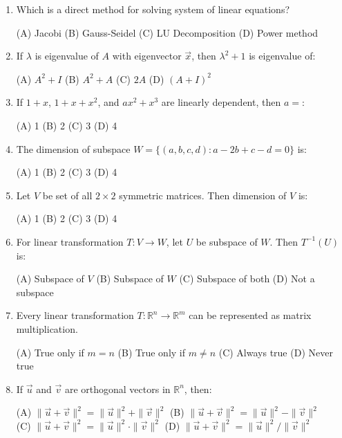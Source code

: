 \documentclass[11pt,a4paper]{article}
\begin{document}
\begin{enumerate}
(A) Arrange in any order \quad (B) Diagonal elements are zero\\
(C) Diagonal elements larger than other elements \quad (D) Cannot be solved

\item Which is a direct method for solving system of linear equations?

(A) Jacobi \quad (B) Gauss-Seidel \quad (C) LU Decomposition \quad (D) Power method

\item If $\lambda$ is eigenvalue of $A$ with eigenvector $\vec{x}$, then $\lambda^2 + 1$ is eigenvalue of:

(A) $A^2 + I$ \quad (B) $A^2 + A$ \quad (C) $2A$ \quad (D) $(A + I)^2$

\item If $1 + x$, $1 + x + x^2$, and $ax^2 + x^3$ are linearly dependent, then $a =$:

(A) 1 \quad (B) 2 \quad (C) 3 \quad (D) 4

\item The dimension of subspace $W = \{(a, b, c, d) : a - 2b + c - d = 0\}$ is:

(A) 1 \quad (B) 2 \quad (C) 3 \quad (D) 4

\item Let $V$ be set of all $2 \times 2$ symmetric matrices. Then dimension of $V$ is:

(A) 1 \quad (B) 2 \quad (C) 3 \quad (D) 4

\item For linear transformation $T: V \to W$, let $U$ be subspace of $W$. Then $T^{-1}(U)$ is:

(A) Subspace of $V$ \quad (B) Subspace of $W$ \quad (C) Subspace of both \quad (D) Not a subspace

\item Every linear transformation $T: \mathbb{R}^n \to \mathbb{R}^m$ can be represented as matrix multiplication.

(A) True only if $m = n$ \quad (B) True only if $m \neq n$ \quad (C) Always true \quad (D) Never true

\item If $\vec{u}$ and $\vec{v}$ are orthogonal vectors in $\mathbb{R}^n$, then:

(A) $\|\vec{u} + \vec{v}\|^2 = \|\vec{u}\|^2 + \|\vec{v}\|^2$ \quad (B) $\|\vec{u} + \vec{v}\|^2 = \|\vec{u}\|^2 - \|\vec{v}\|^2$\\
(C) $\|\vec{u} + \vec{v}\|^2 = \|\vec{u}\|^2 \cdot \|\vec{v}\|^2$ \quad (D) $\|\vec{u} + \vec{v}\|^2 = \|\vec{u}\|^2 / \|\vec{v}\|^2$


\end{enumerate}
\end{document}
